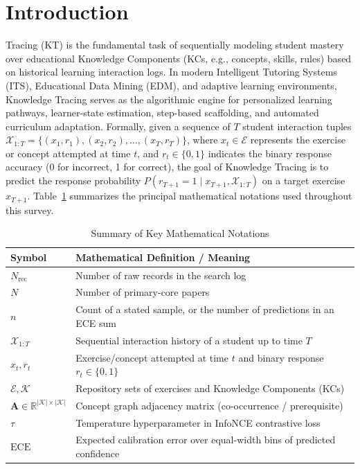 \documentclass[lettersize,journal]{IEEEtran}
\begin{document}
\section{Introduction}
\label{sec:intro}

 Tracing (KT) is the fundamental task of sequentially modeling student mastery over educational Knowledge Components (KCs, e.g., concepts, skills, rules) based on historical learning interaction logs. In modern Intelligent Tutoring Systems (ITS), Educational Data Mining (EDM), and adaptive learning environments, Knowledge Tracing serves as the algorithmic engine for personalized learning pathways, learner-state estimation, step-based scaffolding, and automated curriculum adaptation. Formally, given a sequence of $T$ student interaction tuples $\mathcal{X}_{1:T} = \{(x_1, r_1), (x_2, r_2), \dots, (x_T, r_T)\}$, where $x_t \in \mathcal{E}$ represents the exercise or concept attempted at time $t$, and $r_t \in \{0, 1\}$ indicates the binary response accuracy (0 for incorrect, 1 for correct), the goal of Knowledge Tracing is to predict the response probability $P(r_{T+1} = 1 \mid x_{T+1}, \mathcal{X}_{1:T})$ on a target exercise $x_{T+1}$. Table~\ref{tab:notation_summary} summarizes the principal mathematical notations used throughout this survey.
\begin{table}[t]
\caption{Summary of Key Mathematical Notations}
\label{tab:notation_summary}
\centering
\footnotesize
\begin{tabular}{@{}lp{}@{}}
\toprule
\textbf{Symbol} & \textbf{Mathematical Definition / Meaning} \\
\midrule
$N_{\mathrm{rec}}$ & Number of raw records in the search log \\
$N$ & Number of primary-core papers \\
$n$ & Count of a stated sample, or the number of predictions in an ECE sum \\
$\mathcal{X}_{1:T}$ & Sequential interaction history of a student up to time $T$ \\
$x_t, r_t$ & Exercise/concept attempted at time $t$ and binary response $r_t \in \{0,1\}$ \\
$\mathcal{E}, \mathcal{K}$ & Repository sets of exercises and Knowledge Components (KCs) \\
$\mathbf{A} \in \mathbb{R}^{|\mathcal{K}| \times |\mathcal{K}|}$ & Concept graph adjacency matrix (co-occurrence / prerequisite) \\
$\tau$ & Temperature hyperparameter in InfoNCE contrastive loss \\
$\text{ECE}$ & Expected calibration error over equal-width bins of predicted confidence \\
\bottomrule
\end{tabular}
\end{table}
\end{document}
